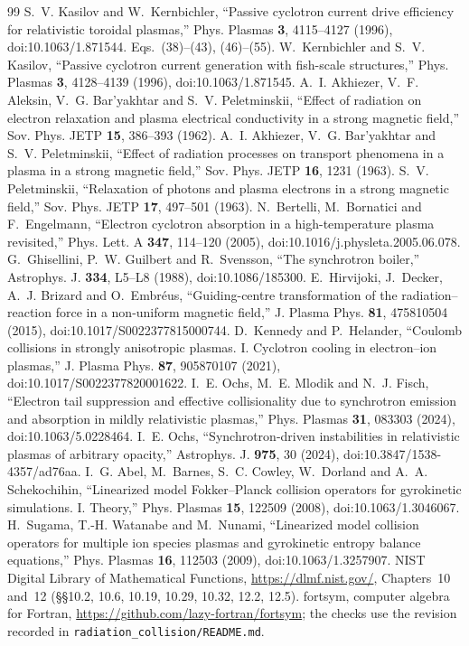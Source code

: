 \documentclass[11pt,a4paper]{article}
\numberwithin{equation}{section}
\begin{document}
\begin{thebibliography}{99}
 S.~V. Kasilov and W.~Kernbichler, ``Passive cyclotron current drive efficiency for relativistic toroidal plasmas,'' Phys. Plasmas \textbf{3}, 4115--4127 (1996), doi:10.1063/1.871544. Eqs.~(38)--(43), (46)--(55).
 W.~Kernbichler and S.~V. Kasilov, ``Passive cyclotron current generation with fish-scale structures,'' Phys. Plasmas \textbf{3}, 4128--4139 (1996), doi:10.1063/1.871545.
 A.~I. Akhiezer, V.~F. Aleksin, V.~G. Bar'yakhtar and S.~V. Peletminskii, ``Effect of radiation on electron relaxation and plasma electrical conductivity in a strong magnetic field,'' Sov. Phys. JETP \textbf{15}, 386--393 (1962).
 A.~I. Akhiezer, V.~G. Bar'yakhtar and S.~V. Peletminskii, ``Effect of radiation processes on transport phenomena in a plasma in a strong magnetic field,'' Sov. Phys. JETP \textbf{16}, 1231 (1963).
 S.~V. Peletminskii, ``Relaxation of photons and plasma electrons in a strong magnetic field,'' Sov. Phys. JETP \textbf{17}, 497--501 (1963).
 N.~Bertelli, M.~Bornatici and F.~Engelmann, ``Electron cyclotron absorption in a high-temperature plasma revisited,'' Phys. Lett. A \textbf{347}, 114--120 (2005), doi:10.1016/j.physleta.2005.06.078.
 G.~Ghisellini, P.~W. Guilbert and R.~Svensson, ``The synchrotron boiler,'' Astrophys. J. \textbf{334}, L5--L8 (1988), doi:10.1086/185300.
 E.~Hirvijoki, J.~Decker, A.~J. Brizard and O.~Embr\'eus, ``Guiding-centre transformation of the radiation--reaction force in a non-uniform magnetic field,'' J. Plasma Phys. \textbf{81}, 475810504 (2015), doi:10.1017/S0022377815000744.
 D.~Kennedy and P.~Helander, ``Coulomb collisions in strongly anisotropic plasmas. I. Cyclotron cooling in electron--ion plasmas,'' J. Plasma Phys. \textbf{87}, 905870107 (2021), doi:10.1017/S0022377820001622.
 I.~E. Ochs, M.~E. Mlodik and N.~J. Fisch, ``Electron tail suppression and effective collisionality due to synchrotron emission and absorption in mildly relativistic plasmas,'' Phys. Plasmas \textbf{31}, 083303 (2024), doi:10.1063/5.0228464.
 I.~E. Ochs, ``Synchrotron-driven instabilities in relativistic plasmas of arbitrary opacity,'' Astrophys. J. \textbf{975}, 30 (2024), doi:10.3847/1538-4357/ad76aa.
 I.~G. Abel, M.~Barnes, S.~C. Cowley, W.~Dorland and A.~A. Schekochihin, ``Linearized model Fokker--Planck collision operators for gyrokinetic simulations. I. Theory,'' Phys. Plasmas \textbf{15}, 122509 (2008), doi:10.1063/1.3046067.
 H.~Sugama, T.-H. Watanabe and M.~Nunami, ``Linearized model collision operators for multiple ion species plasmas and gyrokinetic entropy balance equations,'' Phys. Plasmas \textbf{16}, 112503 (2009), doi:10.1063/1.3257907.
 NIST Digital Library of Mathematical Functions, \url{https://dlmf.nist.gov/}, Chapters~10 and~12 (\S\S10.2, 10.6, 10.19, 10.29, 10.32, 12.2, 12.5).
 fortsym, computer algebra for Fortran, \url{https://github.com/lazy-fortran/fortsym}; the checks use the revision recorded in \texttt{radiation\_collision/README.md}.
\end{thebibliography}
\end{document}
